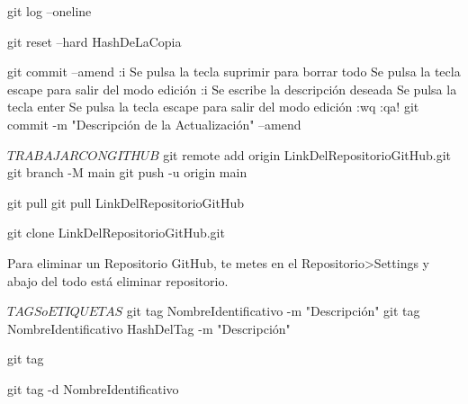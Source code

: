 	git log --oneline	%

	git reset --hard HashDeLaCopia	%

	git commit --amend		%
		:i		%
		Se pulsa la tecla suprimir para borrar todo
		Se pulsa la tecla escape para salir del modo edición
		:i		%
		Se escribe la descripción deseada
		Se pulsa la tecla enter
		Se pulsa la tecla escape para salir del modo edición
		:wq		%
		:qa!	%
	git commit -m "Descripción de la Actualización" --amend		%



$ TRABAJAR CON GITHUB $
	git remote add origin LinkDelRepositorioGitHub.git		%
	git branch -M main
	git push -u origin main									%

	git pull							%
	git pull LinkDelRepositorioGitHub	%

	git clone LinkDelRepositorioGitHub.git		%

	Para eliminar un Repositorio GitHub, te metes en el Repositorio>Settings y abajo del todo está eliminar repositorio.



$ TAGS o ETIQUETAS $
	git tag NombreIdentificativo -m "Descripción"				%
	git tag NombreIdentificativo HashDelTag -m "Descripción"	%

	git tag		%

	git tag -d NombreIdentificativo		%

